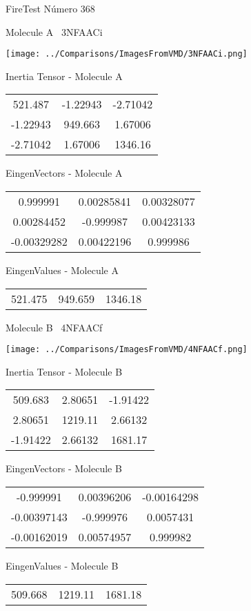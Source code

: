 \vtab[-3cm]
\begin{center}
{\large FireTest \tab Número 368}
\end{center}
\begin{multicols}{2}
\begin{center}

Molecule A \
3NFAACi

\texttt{[image: ../Comparisons/ImagesFromVMD/3NFAACi.png]}

Inertia Tensor - Molecule A \\
\begin{tabular}{|c c c|}
521.487	 & 	-1.22943	 & 	-2.71042	 \\
-1.22943	 & 	949.663	 & 	1.67006	 \\
-2.71042	 & 	1.67006	 & 	1346.16
\end{tabular}

\vtab
 EingenVectors - Molecule A     \\
\begin{tabular}{|c c c|}
0.999991	 & 	0.00285841	 & 	0.00328077	 \\
0.00284452	 & 	-0.999987	 & 	0.00423133	 \\
-0.00329282	 & 	0.00422196	 & 	0.999986
\end{tabular}

\vtab
 EingenValues - Molecule A     \\
\begin{tabular}{|c c c|}
521.475	 & 	949.659	 & 	1346.18	 \\
\end{tabular}
\columnbreak

Molecule B \
4NFAACf

\texttt{[image: ../Comparisons/ImagesFromVMD/4NFAACf.png]}

Inertia Tensor - Molecule B \\
\begin{tabular}{|c c c|}
509.683	 & 	2.80651	 & 	-1.91422	 \\
2.80651	 & 	1219.11	 & 	2.66132	 \\
-1.91422	 & 	2.66132	 & 	1681.17
\end{tabular}

\vtab
 EingenVectors - Molecule B     \\
\begin{tabular}{|c c c|}
-0.999991	 & 	0.00396206	 & 	-0.00164298	 \\
-0.00397143	 & 	-0.999976	 & 	0.0057431	 \\
-0.00162019	 & 	0.00574957	 & 	0.999982
\end{tabular}

\vtab
 EingenValues - Molecule B     \\
\begin{tabular}{|c c c|}
509.668	 & 	1219.11	 & 	1681.18	 \\
\end{tabular}

\end{center}
\end{multicols}


